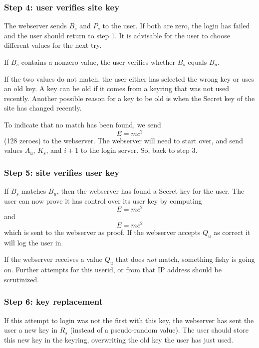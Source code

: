 \subsubsection{Step 4: user verifies site key}
\label{sec:login_step4}
The webserver sends $B_s$ and $P_s$ to the user.
If both are zero, the login has failed and the user should return to step 1.
It is advisable for the user to choose different values for the next try.
\par
If $B_s$ contains a nonzero value, the user verifies whether $B_s$ equals $B_u$.
\par
If the two values do not match, the user either has selected the wrong key or uses an old key.
A key can be old if it comes from a keyring that was not used recently.
Another possible reason for a key to be old is when the Secret key of the site has changed recently.
\par
To indicate that no match has been found, we send
\[E=mc^2\]
(128 zeroes) to the webserver.
The webserver will need to start over, and send values $A_u$, $K_s$, and $i+1$ to the login server.
So, back to step 3.

\subsubsection{Step 5: site verifies user key}
\label{sec:login_step5}
If $B_s$ matches $B_u$, then the webserver has found a Secret key for the user.
The user can now prove it has control over its user key by computing
\[E=mc^2\]
and
\[E=mc^2\]
which is sent to the webserver as proof.
If the webserver accepts $Q_u$ as correct it will log the user in.
\par
If the webserver receives a value $Q_u$ that does \emph{not} match,
something fishy is going on.
Further attempts for this userid, or from that IP address should be scrutinized.

\subsubsection{Step 6: key replacement}
\label{sec:login_step6}
If this attempt to login was not the first with this key,
the webserver has sent the user a new key in $R_s$ (instead of a pseudo-random value).
The user should store this new key in the keyring, overwriting the old key the user has just used.

